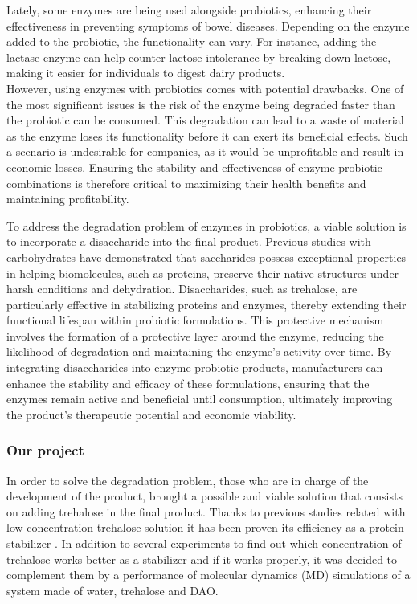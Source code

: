 \documentclass[12pt,twoside]{article}
\begin{document}
Lately, some enzymes are being used alongside probiotics, enhancing their effectiveness in preventing symptoms of bowel diseases. Depending on the enzyme added to the probiotic, the functionality can vary. For instance, adding the lactase enzyme can help counter lactose intolerance by breaking down lactose, making it easier for individuals to digest dairy products.
\\[10pt]
However, using enzymes with probiotics comes with potential drawbacks. One of the most significant issues is the risk of the enzyme being degraded faster than the probiotic can be consumed. This degradation can lead to a waste of material as the enzyme loses its functionality before it can exert its beneficial effects. Such a scenario is undesirable for companies, as it would be unprofitable and result in economic losses. Ensuring the stability and effectiveness of enzyme-probiotic combinations is therefore critical to maximizing their health benefits and maintaining profitability.

To address the degradation problem of enzymes in probiotics, a viable solution is to incorporate a disaccharide into the final product. Previous studies with carbohydrates have demonstrated that saccharides possess exceptional properties in helping biomolecules, such as proteins, preserve their native structures under harsh conditions and dehydration. Disaccharides, such as trehalose, are particularly effective in stabilizing proteins and enzymes, thereby extending their functional lifespan within probiotic formulations. This protective mechanism involves the formation of a protective layer around the enzyme, reducing the likelihood of degradation and maintaining the enzyme's activity over time. By integrating disaccharides into enzyme-probiotic products, manufacturers can enhance the stability and efficacy of these formulations, ensuring that the enzymes remain active and beneficial until consumption, ultimately improving the product's therapeutic potential and economic viability\cite{shao_trehalose_2019}.



\subsubsection{Our project}

In order to solve the degradation problem, those who are in charge of the development of the product, brought a possible and viable solution that consists on adding trehalose in the final product. Thanks to previous studies related with low-concentration trehalose solution it has been proven its efficiency as a protein stabilizer \cite{shao_trehalose_2019}. 
In addition to several experiments to find out which concentration of trehalose works better as a stabilizer and if it works properly, it was decided to complement them by a performance of molecular dynamics (MD) simulations of a system made of water, trehalose and DAO. 
\end{document}
